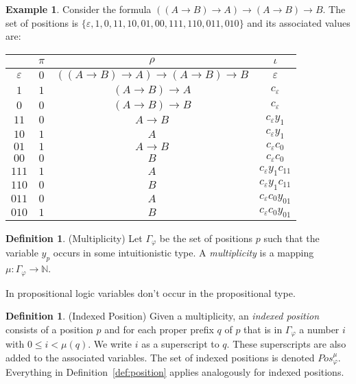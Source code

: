 \documentclass[11pt]{article}
\theoremstyle{definition}
\theoremstyle{definition}
\theoremstyle{definition}
\theoremstyle{definition}
\theoremstyle{definition}
\newtheorem{definition}[theorem]{Definition}
\theoremstyle{definition}
\newtheorem{example}[theorem]{Example}
\theoremstyle{definition}
\newcommand{\N}{\mathbb N}
\newcommand{\pos}{\mathit{Pos}}
\begin{document}
	\begin{example}
		Consider the formula $((A\to B)\to A)\to(A\to B)\to B$. The set of positions is $\{\varepsilon, 1, 0, 11, 10, 01, 00, 111, 110, 011, 010\}$ and its associated values are:
		\begin{center}
		\begin{tabular}{c|c|c|c}
			&$\pi$&$\rho$&$\iota$\\\hline
			$\varepsilon$&$0$&$((A\to B)\to A)\to(A\to B)\to B$&$\varepsilon$\\
			$1$&$1$&$(A\to B)\to A$&$c_\varepsilon$\\
			$0$&$0$&$(A\to B)\to B$&$c_\varepsilon$\\
			$11$&$0$&$A\to B$&$c_\varepsilon y_1$\\
			$10$&$1$&$A$&$c_\varepsilon y_1$\\
			$01$&$1$&$A\to B$&$c_\varepsilon c_0$\\
			$00$&$0$&$B$&$c_\varepsilon c_0$\\
			$111$&$1$&$A$&$c_\varepsilon y_1c_{11}$\\
			$110$&$0$&$B$&$c_\varepsilon y_1c_{11}$\\
			$011$&$0$&$A$&$c_\varepsilon c_0y_{01}$\\
			$010$&$1$&$B$&$c_\varepsilon c_0y_{01}$
		\end{tabular}
		\end{center}
	\end{example}

	\begin{definition}(Multiplicity)
		Let $\Gamma_\varphi$ be the set of positions $p$ such that the variable $y_p$ occurs in some intuitionistic type. A \emph{multiplicity} is a mapping $\mu: \Gamma_\varphi\to\N$.
	\end{definition}

	In propositional logic variables don't occur in the propositional type.

	\begin{definition}(Indexed Position)
		Given a multiplicity, an \emph{indexed position} consists of a position $p$ and for each proper prefix $q$ of $p$ that is in $\Gamma_\varphi$ a number $i$ with $0\leq i<\mu(q)$. We write $i$ as a superscript to $q$. These superscripts are also added to the associated variables. The set of indexed positions is denoted $\pos_\varphi^\mu$. Everything in Definition~\ref{def:position} applies analogously for indexed positions.
	\end{definition}
\end{document}
